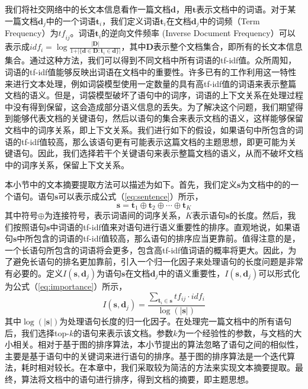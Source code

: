 我们将社交网络中的长文本信息看作一篇文档$\mathbf{d}$，用$\mathbf{t}$表示文档中的词语。对于某一篇文档$\mathbf{d}_j$中的一个词语$\mathbf{t}_i$，我们定义词语$\mathbf{t}_i$在文档$\mathbf{d}_j$中的词频（Term Frequency）为${\textit{tf}}_{ij}$。词语$\mathbf{t}_i$的逆向文件频率 (Inverse Document Frequency）可以表示成${idf}_i = \log \frac{\vert \mathbf{D} \vert}{1 + \vert \{\mathbf{d} \in \mathbf{D} : \mathbf{t}_i \in \mathbf{d}\}\vert}$，其中$\mathbf{D}$表示整个文档集合，即所有的长文本信息集合。通过这种方法，我们可以得到不同文档中所有词语的tf-idf值。众所周知，词语的tf-idf值能够反映出词语在文档中的重要性。许多已有的工作利用这一特性来进行文本处理，例如词袋模型使用一定数量的具有高tf-idf值的词语来表示整篇文档的语义。但是，词袋模型破坏了语句中的词序，词语的上下文关系在处理过程中没有得到保留，这会造成部分语义信息的丢失。为了解决这个问题，我们期望得到能够代表文档的关键语句，然后以语句的集合来表示文档的语义，这样能够保留文档中的词序关系，即上下文关系。我们进行如下的假设，如果语句中所包含的词语的tf-idf值较高，那么该语句更有可能表示这篇文档的主题思想，即更可能为关键语句。因此，我们选择若干个关键语句来表示整篇文档的语义，从而不破坏文档中的词序关系，保留上下文关系。

本小节中的文本摘要提取方法可以描述为如下。首先，我们定义$\mathbf{s}$为文档中的的一个语句。语句$\mathbf{s}$可以表示成公式（\ref{eq:sentence}）所示，
\begin{equation}
\label{eq:sentence}
	\mathbf{s}=\mathbf{t}_1 \oplus \mathbf{t}_2 \oplus \cdots \oplus \mathbf{t}_K
\end{equation}
其中符号$\oplus$为连接符号，表示词语间的词序关系，$K$表示语句$\mathbf{s}$的长度。然后，我们按照语句$\mathbf{s}$中词语的tf-idf值来对语句进行语义重要性的排序。直观地说，如果语句$\mathbf{s}$中所包含的词语的tf-idf值较高，那么语句的排序应当更靠前。值得注意的是，一个长语句所包含的词语将会更多，包含高tf-idf值词语的概率将更大。因此，为了避免长语句的排名更加靠前，引入一个归一化因子来处理语句的长度问题是非常有必要的。定义$I(\mathbf{s}, \mathbf{d}_j)$为语句$\mathbf{s}$在文档$\mathbf{d}_j$中的语义重要性，$I(\mathbf{s}, \mathbf{d}_j)$可以形式化为公式（\ref{eq:importance}）所示，
\begin{equation}
\label{eq:importance}
	I(\mathbf{s}, \mathbf{d}_j)=\frac{\sum \nolimits_{\mathbf{t}_i \in \mathbf{s}} {tf}_{ij}\cdot{idf}_i }{\log \left(\vert\mathbf{s}\vert\right)}
\end{equation}
其中$\log \left(\vert\mathbf{s}\vert\right)$为处理语句长度的归一化因子。在处理完一篇文档中的所有语句后，我们选择top-$k$的语句来表示该文档。参数$k$为一个经验性的参数，与文档的大小相关。相对于基于图的排序算法，本小节提出的算法忽略了语句之间的相似性，主要是基于语句中的关键词来进行语句的排序。基于图的排序算法是一个迭代算法，耗时相对较长。在本章中，我们采取较为简洁的方法来实现文本摘要提取。最终，算法将文档中的语句进行排序，得到文档的摘要，即主题思想。


